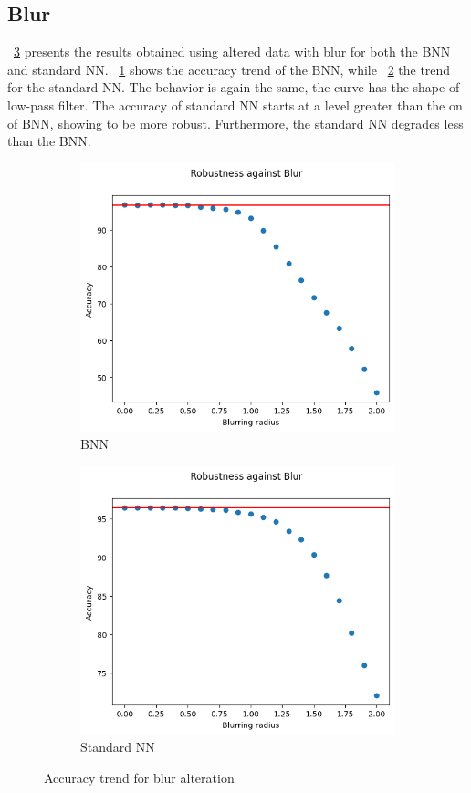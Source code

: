 \subsection{Blur}

\Fig~\ref{fig:acc_bl_wu} presents the results obtained using altered data with blur for both the BNN and standard NN. \Fig~\ref{fig:bl_acc_wu_bnn} shows the accuracy trend of the BNN, while \Fig~\ref{fig:blur_ann} the trend for the standard NN. The behavior is again the same, the curve has the shape of low-pass filter. The accuracy of standard NN starts at a level greater than the on of BNN, showing to be more robust. Furthermore, the standard NN degrades less than the BNN.

\begin{figure}[h]
	\centering
	\begin{subfigure}{.5\textwidth}
		\centering
		\includegraphics[width=0.9\linewidth]{ImageFiles/EvalBNN/BL/WU/acc}
		\caption{BNN}
		\label{fig:bl_acc_wu_bnn}
	\end{subfigure}%
	\begin{subfigure}{.5\textwidth}
		\centering
		\includegraphics[width=0.9\linewidth]{ImageFiles/EvalANN/blur_ann}
		\caption{Standard NN}
		\label{fig:blur_ann}
	\end{subfigure}
	\caption{Accuracy trend for blur alteration}
	\label{fig:acc_bl_wu}
\end{figure}

